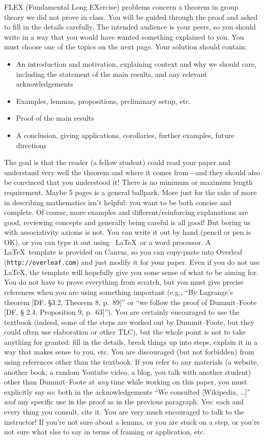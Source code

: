 FLEX (Fundamental Long EXercise) problems concern a theorem in group theory we did 
not prove in class.  You will be guided through the proof and asked to fill in the 
details carefully.  The intended audience is your peers, so you should write in a 
way that you would have wanted something explained to you.  You must choose one of 
the topics on the next page.  Your solution should contain:
\begin{itemize}
  \item An introduction and motivation, explaining context and why we should care, 
  including the statement of the main results, and any relevant acknowledgements 
  \item Examples, lemmas, propositions, preliminary setup, etc.
  \item Proof of the main results
  \item A conclusion, giving applications, corollaries, further examples, future 
  directions
\end{itemize}
The goal is that the reader (a fellow student) could read your paper and understand
very well the theorem and where it comes from---and they should also be convinced 
that you understood it!
There is no minimum or maximum length requirement.  Maybe 5 pages is a general 
ballpark.  More just for the sake of more in describing mathematics isn't helpful: 
you want to be both concise and complete.  Of course, more examples and 
different/reinforcing explanations are good, reviewing concepts and generally being
careful is all good!  But boring us with associativity axioms is not.  
You can write it out by hand (pencil or pen is OK), or you can type it out using \
LaTeX\ or a word processor.  A \LaTeX\ template is provided on Canvas, so you can 
copy-paste into Overleaf (\verb|http://overleaf.com|) and just modify it for your 
paper.  Even if you do not use \LaTeX, the template will hopefully give you some 
sense of what to be aiming for.  
You do not have to prove everything from scratch, but you must give precise 
references when you are using something important (e.g., ``By Lagrange's theorem 
[DF, \S 3.2, Theorem 8, p.~89]'' or ``we follow the proof of Dummit--Foote [DF, \S 
2.4, Proposition 9, p.~63]'').  You are certainly encouraged to use the textbook 
(indeed, some of the steps are worked out by Dummit--Foote, but they could often 
use elaboration or other TLC), but the whole point is not to take anything for 
granted: fill in the details, break things up into steps, explain it in a way that 
makes sense to you, etc.  
You are discouraged (but not forbidden) from using references other than the 
textbook.  If you refer to any materials (a website, another book, a random Youtube
video, a blog, you talk with another student) other than Dummit--Foote at
\emph{any} time while working on this paper, you must explicitly say so: both in the
acknowledgements ``We consulted [Wikipedia, \ldots]'' \emph{and} any specific use in 
the proof as in the previous paragraph.  Yes: each and every thing you consult, 
cite it.  
You are very much encouraged to talk to the instructor!  If you're not sure about a
lemma, or you are stuck on a step, or you're not sure what else to say in terms of 
framing or application, etc.  
